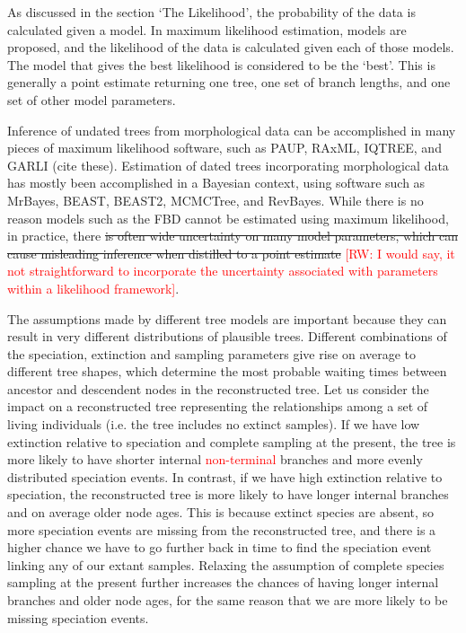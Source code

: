 \documentclass[11pt]{article}
\makeatletter
\newcommand{\rw}[1]{{\textcolor{red}{[RW: #1]}}} %
\newcommand{\edit}[1]{{\textcolor{red}{#1}}} %
\newenvironment{boxedtext}[1]{%
  \begin{mdframed}[frametitle=#1,
    frametitlefont=\scshape\mdseries\sffamily,
    frametitlealignment=\centering,
    backgroundcolor=black!20,
    hidealllines=true,
    innerleftmargin=11\p@,innerrightmargin=11\p@,
    frametitleaboveskip=0.5\baselineskip,
    innerbottommargin=0.5\baselineskip,
    skipabove=\baselineskip,skipbelow=0.5\baselineskip]
}{%
  \end{mdframed}%
}
\makeatother
\begin{document}
\begin{boxedtext}{Maximum Likelihood and Bayesian Esitmation}

As discussed in the section `The Likelihood', the probability of the data is calculated given a model. 
In maximum likelihood estimation, models are proposed, and the likelihood of the data is calculated given each of those models.
The model that gives the best likelihood is considered to be the `best'.
This is generally a point estimate returning one tree, one set of branch lengths, and one set of other model parameters.

Inference of undated trees from morphological data can be accomplished in many pieces of maximum likelihood software, such as PAUP, RAxML, IQTREE, and GARLI (cite these).
Estimation of dated trees incorporating morphological data has mostly been accomplished in a Bayesian context, using software such as MrBayes, BEAST, BEAST2, MCMCTree, and RevBayes.
While there is no reason models such as the FBD cannot be estimated using maximum likelihood, in practice, there \sout{is often wide uncertainty on many model parameters, which can cause misleading inference when distilled to a point estimate} \rw{I would say, it not straightforward to incorporate the uncertainty associated with parameters within a likelihood framework}.
\end{boxedtext}


The assumptions made by different tree models are important because they can result in very different distributions of plausible trees.
Different combinations of the speciation, extinction and sampling parameters give rise on average to different tree shapes, which determine the most probable waiting times between ancestor and descendent nodes 
in the reconstructed tree.
Let us consider the impact on a reconstructed tree representing the relationships among a set of living individuals (i.e. the tree includes no extinct samples). 
If we have low extinction relative to speciation and complete sampling at the present, the tree is more likely to have shorter internal \edit{non-terminal} branches and more evenly distributed speciation events.
In contrast, if we have high extinction relative to speciation, the reconstructed tree is more likely to have longer internal branches and on average older node ages. 
This is because extinct species are absent, so more speciation events are missing from the reconstructed tree, and there is a higher chance we have to go further back in time to find the speciation event linking any of our extant samples.
Relaxing the assumption of complete species sampling at the present further increases the chances of having longer internal branches and older node ages, for the same reason that we are more likely to be missing speciation events.
\end{document}
